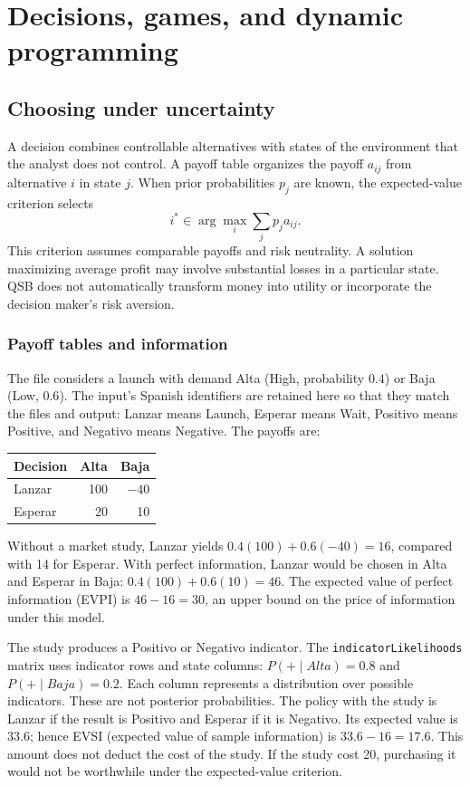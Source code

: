 \chapter{Decisions, games, and dynamic programming}
\label{chap:decisiones}

\section{Choosing under uncertainty}
A decision combines controllable alternatives with states of the environment
that the analyst does not control. A payoff table organizes the payoff $a_{ij}$
from alternative $i$ in state $j$. When prior probabilities $p_j$ are known,
the expected-value criterion selects
\[
 i^*\in\arg\max_i\sum_j p_j a_{ij}.
\]
This criterion assumes comparable payoffs and risk neutrality. A solution
maximizing average profit may involve substantial losses in a particular state.
QSB does not automatically transform money into utility or incorporate the
decision maker's risk aversion.

\subsection{Payoff tables and information}
The file  considers a launch with demand Alta (High,
probability $0.4$) or Baja (Low, $0.6$). The input's Spanish identifiers are
retained here so that they match the files and output: Lanzar means Launch,
Esperar means Wait, Positivo means Positive, and Negativo means Negative.
The payoffs are:
\begin{center}
\begin{tabular}{lrr}
\toprule
Decision & Alta & Baja\\
\midrule
Lanzar & 100 & $-40$\\
Esperar & 20 & 10\\
\bottomrule
\end{tabular}
\end{center}
Without a market study, Lanzar yields $0.4(100)+0.6(-40)=16$, compared with
14 for Esperar. With perfect information, Lanzar would be chosen in Alta and
Esperar in Baja: $0.4(100)+0.6(10)=46$. The expected value of perfect
information (EVPI) is $46-16=30$, an upper bound on the price of information
under this model.

The study produces a Positivo or Negativo indicator. The
\texttt{indicatorLikelihoods} matrix uses indicator rows and state columns:
$P(+\mid Alta)=0.8$ and $P(+\mid Baja)=0.2$. Each column represents a
distribution over possible indicators. These are not posterior probabilities.
The policy with the study is Lanzar if the result is Positivo and Esperar if
it is Negativo. Its expected value is $33.6$; hence EVSI (expected value of
sample information) is $33.6-16=17.6$. This amount does not deduct the cost
of the study. If the study cost 20, purchasing it would not be worthwhile
under the expected-value criterion.


